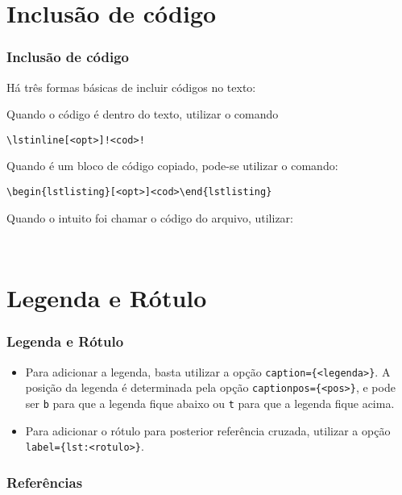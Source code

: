 \documentclass[brazilian]{beamer}
\begin{document}
\section{Inclusão de código}
\begin{frame}[fragile]
    \frametitle{Inclusão de código}

Há três formas básicas de incluir códigos no texto: 

Quando o código é dentro do texto, utilizar o comando 
\begin{lstlisting}[style=myStyleLatex, numbers=none]
    \lstinline[<opt>]!<cod>!
\end{lstlisting}
Quando é um bloco de código copiado, pode-se utilizar o comando:

\lstinline[style=myStyleLatex,]!\begin{lstlisting}[<opt>]<cod>\end{lstlisting}!

Quando o intuito foi chamar o código do arquivo, utilizar:
\begin{lstlisting}[style=myStyleLatex, numbers=none]
    
\end{lstlisting}
\end{frame}

\section{Legenda e Rótulo}
\begin{frame}[fragile]
    \frametitle{Legenda e Rótulo}

    \begin{itemize}
        \item Para adicionar a legenda, basta utilizar a opção \texttt{caption=\{<legenda>\}}. A posição da legenda é determinada pela opção \texttt{captionpos=\{<pos>\}}, e pode ser \texttt{b} para que a legenda fique abaixo ou \texttt{t} para que a legenda fique acima.
        \item  Para adicionar o rótulo para posterior referência cruzada, utilizar a opção \texttt{label=\{lst:<rotulo>\}}.
    \end{itemize}

\end{frame}

\begin{frame}[allowframebreaks]
    \frametitle{Referências}

    \nocite{*}
    \printbibliography[keyword={inserirCodigos}]

\end{frame}
\end{document}
